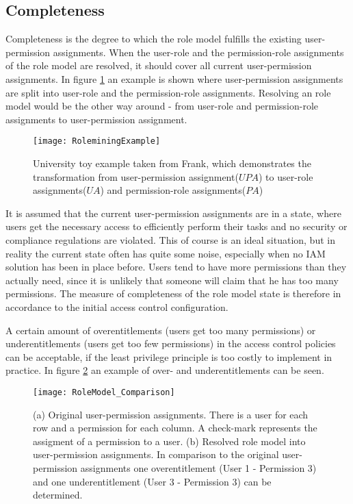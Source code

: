         \subsection{Completeness}
        \label{sec:completeness}
        Completeness is the degree to which the role model fulfills the existing user-permission assignments. When the user-role and the permission-role assignments of the role model are resolved, it should cover all current user-permission assignments. In figure \ref{fig:roleminingExample} an example is shown where user-permission assignments are split into user-role and the permission-role assignments. Resolving an role model would be the other way around - from user-role and permission-role assignments to user-permission assignment.
        \iffalse
        \hl{(FEEDBACK:different scenarios: 1. starting from scratch, 2. already have assignments)}
        \fi
        \begin{figure}[H]
            \centering
            \texttt{[image: RoleminingExample]}
            \caption{University toy example taken from Frank\cite{roleMiningExample}, which demonstrates the transformation from user-permission assignment($UPA$) to user-role assignments($UA$) and permission-role assignments($PA$)}
            \label{fig:roleminingExample}
        \end{figure}
        It is assumed that the current user-permission assignments are in a state, where users get the necessary access to efficiently perform their tasks and no security or compliance regulations are violated. This of course is an ideal situation, but in reality the current state often has quite some noise, especially when no IAM solution has been in place before. Users tend to have more permissions than they actually need, since it is unlikely that someone will claim that he has too many permissions. The measure of completeness of the role model state is therefore in accordance to the initial access control configuration.
        
        A certain amount of overentitlements (users get too many permissions) or underentitlements (users get too few permissions) in the access control policies can be acceptable, if the least privilege principle is too costly to implement in practice. In figure \ref{fig:rolemodelComparison} an example of over- and underentitlements can be seen.
        
        \begin{figure}[H]
            \centering
            \texttt{[image: RoleModel\_Comparison]}
            \caption{(a) Original user-permission assignments. There is a user for each row and a permission for each column. A check-mark represents the assigment of a permission to a user. (b) Resolved role model into user-permission assignments. In comparison to the original user-permission assignments one overentitlement (User 1 - Permission 3) and one underentitlement (User 3 - Permission 3) can be determined.}
            \label{fig:rolemodelComparison}
        \end{figure}
        
